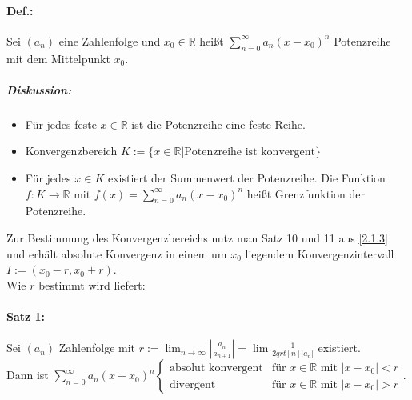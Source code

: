 \paragraph{Def.:} Sei $(a_n)$ eine Zahlenfolge und $x_0 \in \mathbb{R}$ heißt $\boxed{\sum_{n=0}^\infty a_n (x-x_0)^n}$ Potenzreihe mit dem Mittelpunkt $x_0$.
\subparagraph{Diskussion:} 
\begin{itemize}
\item Für jedes feste $x \in \mathbb{R}$ ist die Potenzreihe eine feste Reihe.
\item Konvergenzbereich $K:=\{x\in \mathbb{R} | \text{Potenzreihe ist konvergent}\}$
\item Für jedes $x\in K$ existiert der Summenwert der Potenzreihe. Die Funktion $f: K \to \mathbb{R}$ mit $f(x) = \sum_{n=0}^\infty a_n (x-x_0)^n$ heißt Grenzfunktion der Potenzreihe.
\end{itemize}
Zur Bestimmung des Konvergenzbereichs nutz man Satz 10 und 11 aus \ref{2.1.3} und erhält absolute Konvergenz in einem um $x_0$ liegendem Konvergenzintervall $I:=(x_0-r, x_0+r)$.\\
Wie $r$ bestimmt wird liefert:

\paragraph{Satz 1:} Sei $(a_n)$ Zahlenfolge mit $r:=\lim_{n\to \infty} \left| \frac{a_n}{a_{n+1}}\right|=\lim \frac{1}{2qrt[n]{|a_n|}}$ existiert.\\
Dann ist $\sum_{n=0}^\infty a_n (x-x_0)^n\begin{cases}
\text{absolut konvergent} & \text{für }x\in \mathbb{R} \text{ mit }|x-x_0|<r\\
\text{divergent} & \text{für }x\in \mathbb{R} \text{ mit }|x-x_0|>r
\end{cases}$.

